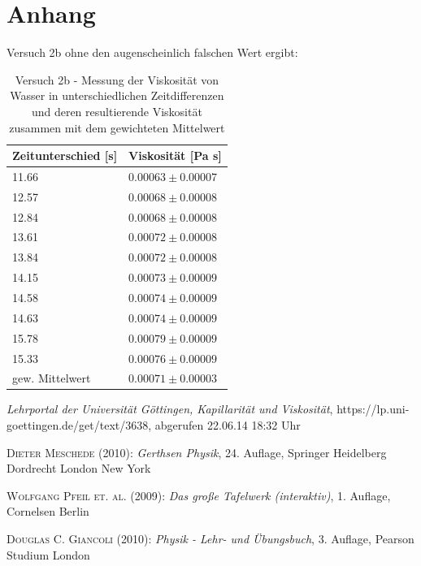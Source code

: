 \documentclass[12pt,a4paper,titlepage,headinclude,bibtotoc]{scrartcl}
\begin{document}
\section{Anhang}
Versuch 2b ohne den augenscheinlich falschen Wert ergibt:
\begin{table}[!h]
\centering
\begin{tabular}{|l|l|}
 \hline
Zeitunterschied [s] & Viskosität [Pa s]\\
\hline\hline
\num{11.66} & $0.00063 \pm 0.00007$\\
\hline
\num{12.57} & $0.00068 \pm 0.00008$\\
\hline
\num{12.84} & $0.00068 \pm 0.00008$\\
\hline
\num{13.61} & $0.00072 \pm 0.00008$\\
\hline
\num{13.84} & $0.00072 \pm 0.00008$\\
\hline
\num{14.15} & $0.00073 \pm 0.00009$\\
\hline
\num{14.58} & $0.00074 \pm 0.00009$\\
\hline
\num{14.63} & $0.00074 \pm 0.00009$\\
\hline
\num{15.78} & $0.00079 \pm 0.00009$\\
\hline
\num{15.33} & $0.00076 \pm 0.00009$\\
\hline\hline
gew. Mittelwert & $0.00071 \pm 0.00003$\\
\hline
\end{tabular}
\caption{Versuch 2b - Messung der Viskosität von Wasser in unterschiedlichen Zeitdifferenzen und deren resultierende Viskosität zusammen mit dem gewichteten Mittelwert\label{tbl:visko2b}}
\end{table}
\begin{thebibliography}{1000}

	\emph{Lehrportal der Universität Göttingen, Kapillarität und Viskosität},
  https://lp.uni-goettingen.de/get/text/3638, abgerufen 22.06.14 18:32 Uhr

	\textsc{Dieter Meschede} (2010): \emph{Gerthsen Physik}, 24. Auflage, Springer Heidelberg
Dordrecht London New York

	\textsc{Wolfgang Pfeil et. al.} (2009): \emph{Das große Tafelwerk (interaktiv)}, 1. Auflage, Cornelsen Berlin

	\textsc{Douglas C. Giancoli} (2010): \emph{Physik - Lehr- und Übungsbuch}, 3. Auflage, Pearson Studium London
\end{thebibliography}
\end{document}
